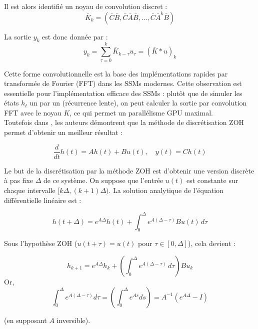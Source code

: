 Il est alors identifié un noyau de convolution discret :
\begin{equation}
    \bar{K}_k = (\bar{C}\bar{B}, \bar{C}\bar{A}\bar{B}, \dots, \bar{C}\bar{A}^k\bar{B})
\end{equation}

La sortie $y_k$ est donc donnée par :
\begin{equation}
    y_k = \sum_{\tau=0}^k \bar{K}_{k - \tau} u_{\tau} = (\bar{K} * u)_k
\end{equation}

Cette forme convolutionnelle est la base des implémentations rapides par transformée de Fourier (FFT) dans les SSMs modernes. Cette observation est essentielle pour l'implémentation efficace des SSMs : plut\^ot que de simuler les états $h_t$ un par un (récurrence lente), on peut calculer la sortie par convolution FFT avec le noyau $K$, ce qui permet un parallélisme GPU maximal.\\

Toutefois dans \citep{gu2021combining}, les auteurs démontrent que la méthode de discrétisation ZOH permet d'obtenir un meilleur résultat : 

\begin{equation}
    \frac{d}{dt} h(t) = A h(t) + B u(t), \quad y(t) = C h(t)
\end{equation}

Le but de la discrétisation par la méthode ZOH est d’obtenir une version discrète à pas fixe $\Delta$ de ce système. On suppose que l’entrée $u(t)$ est constante sur chaque intervalle $[k\Delta, (k+1)\Delta)$. La solution analytique de l'équation différentielle linéaire est :

\begin{equation}
    h(t + \Delta) = e^{A \Delta} h(t) + \int_0^\Delta e^{A (\Delta - \tau)} B u(t) \, d\tau
\end{equation}

Sous l’hypothèse ZOH ($u(t+\tau) = u(t)$ pour $\tau \in [0, \Delta]$), cela devient :

\begin{equation}
    h_{k+1} = e^{A \Delta} h_k + \left( \int_0^\Delta e^{A (\Delta - \tau)} \, d\tau \right) B u_k
\end{equation}
Or,
\begin{equation}
    \int_0^\Delta e^{A (\Delta - \tau)} d\tau = \left( \int_0^\Delta e^{A s} ds \right) = A^{-1} (e^{A \Delta} - I)
\end{equation}

(en supposant $A$ inversible).\\

